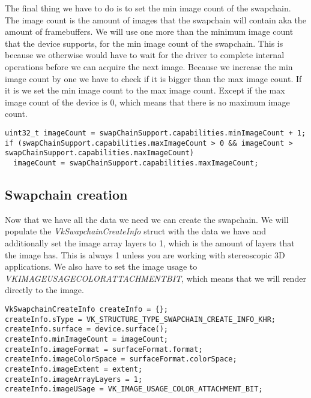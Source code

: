 \documentclass[12pt]{report} \usepackage{preamble}
\begin{document}
The final thing we have to do is to set the min image count of the swapchain. The image count is the amount
of images that the swapchain will contain aka the amount of framebuffers. We will use one more than the
minimum image count that the device supports, for the min image count of the swapchain. This is because
we otherwise would have to wait for the driver to complete internal operations before we can acquire the
next image. Because we increase the min image count
by one we have to check if it is bigger than the max image count. If it is we set the min image count to the
max image count. Except if the max image count of the device is 0, which means that there is no maximum image count.

\begin{lstlisting}[Language=C++]
uint32_t imageCount = swapChainSupport.capabilities.minImageCount + 1;
if (swapChainSupport.capabilities.maxImageCount > 0 && imageCount > swapChainSupport.capabilities.maxImageCount)
  imageCount = swapChainSupport.capabilities.maxImageCount;
\end{lstlisting}

\subsection{Swapchain creation}

Now that we have all the data we need we can create the swapchain. We will populate the
\textit{VkSwapchainCreateInfo} struct with the data we have and additionally set the
image array layers to 1, which is the amount of layers that the image has. This is always
1 unless you are working with stereoscopic 3D applications. We also have to set the image
usage to
\textit{VK\textunderscore IMAGE\textunderscore USAGE\textunderscore COLOR\textunderscore ATTACHMENT\textunderscore BIT},
which means that we will render directly to the image.

\begin{lstlisting}[Language=C++]
VkSwapchainCreateInfo createInfo = {};
createInfo.sType = VK_STRUCTURE_TYPE_SWAPCHAIN_CREATE_INFO_KHR;
createInfo.surface = device.surface();
createInfo.minImageCount = imageCount;
createInfo.imageFormat = surfaceFormat.format;
createInfo.imageColorSpace = surfaceFormat.colorSpace;
createInfo.imageExtent = extent;
createInfo.imageArrayLayers = 1;
createInfo.imageUSage = VK_IMAGE_USAGE_COLOR_ATTACHMENT_BIT;
\end{lstlisting}
\end{document}
